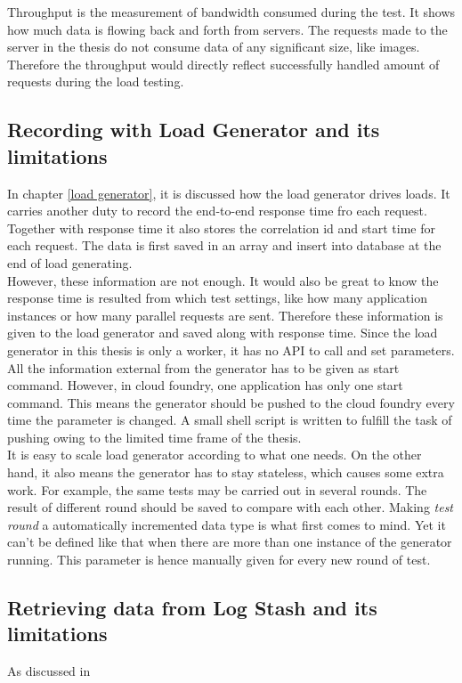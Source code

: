 Throughput is the measurement of bandwidth consumed during the test. It shows how much data is flowing back and forth from servers. The requests made to the server in the thesis do not consume data of any significant size, like images. Therefore the throughput would directly reflect successfully handled amount of requests during the load testing. \\
\subsection{Recording with Load Generator and its limitations}
 In chapter \ref{load generator}, it is discussed how the load generator drives loads. It carries another duty to record the end-to-end response time fro each request. Together with response time it also stores the correlation id and start time for each request. The data is first saved in an array and insert into database at the end of load generating. \\
 However, these information are not enough. It would also be great to know the response time is resulted from which test settings, like how many application instances or how many parallel requests are sent. Therefore these information is given to the load generator and saved along with response time. Since the load generator in this thesis is only a worker, it has no API to call and set parameters. All the information external from the generator has to be given as start command. However, in cloud foundry, one application has only one start command. This means the generator should be pushed to the cloud foundry every time the parameter is changed. A small shell script is written to fulfill the task of pushing owing to the limited time frame of the thesis. \\
 It is easy to scale load generator according to what one needs. On the other hand, it also means the generator has to stay stateless, which causes some extra work. For example, the same tests may be carried out in several rounds. The result of different round should be saved to compare with each other. Making \textit{test round }a automatically incremented data type is what first comes to mind. Yet it can't be defined like that when there are more than one instance of the generator running. This parameter is hence manually given for every new round of test.\\
 
\subsection{Retrieving data from Log Stash and its limitations}
As discussed in 
